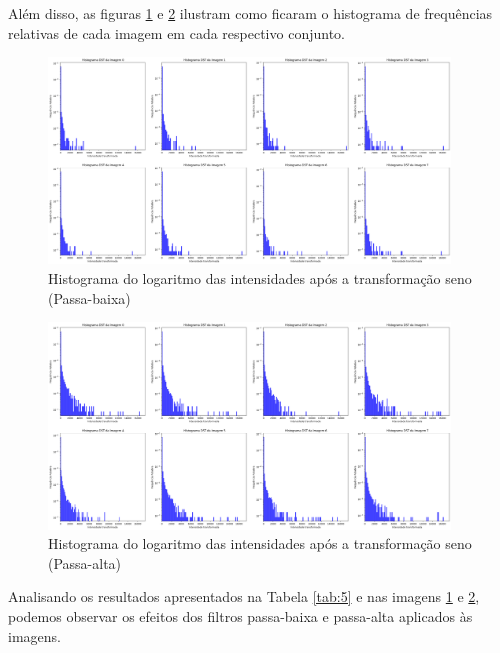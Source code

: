 \documentclass[a4paper, 11pt]{article}
\begin{document}
Além disso, as figuras \ref{fig:5_hist1} e \ref{fig:5_hist2} ilustram como ficaram o histograma de frequências relativas de cada imagem em cada respectivo conjunto.

\begin{figure}[H]
    \centering
    \includegraphics[width=0.95\textwidth]{imgs/5_hist1.png}
    \caption{Histograma do logaritmo das intensidades após a transformação seno (Passa-baixa)}
    \label{fig:5_hist1} %
\end{figure}

\begin{figure}[H]
    \centering
    \includegraphics[width=0.95\textwidth]{imgs/5_hist2.png}
    \caption{Histograma do logaritmo das intensidades após a transformação seno (Passa-alta)}
    \label{fig:5_hist2} %
\end{figure}

Analisando os resultados apresentados na Tabela \ref{tab:5} e nas imagens \ref{fig:5_hist1} e \ref{fig:5_hist2}, podemos observar os efeitos dos filtros passa-baixa e passa-alta aplicados às imagens.
\end{document}
